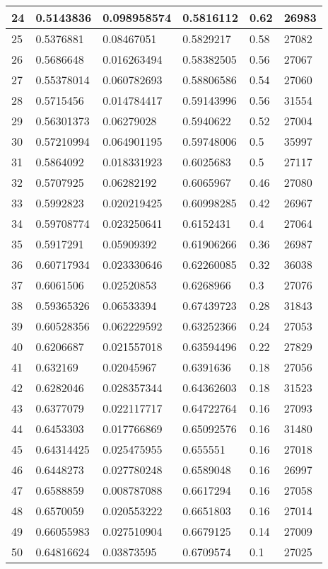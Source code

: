 \begin{longtable}{|l|l|l|l|l|l|}
24 & 0.5143836 & 0.098958574 & 0.5816112 & 0.62 & 26983 \\ \hline 
25 & 0.5376881 & 0.08467051 & 0.5829217 & 0.58 & 27082 \\ \hline 
26 & 0.5686648 & 0.016263494 & 0.58382505 & 0.56 & 27067 \\ \hline 
27 & 0.55378014 & 0.060782693 & 0.58806586 & 0.54 & 27060 \\ \hline 
28 & 0.5715456 & 0.014784417 & 0.59143996 & 0.56 & 31554 \\ \hline 
29 & 0.56301373 & 0.06279028 & 0.5940622 & 0.52 & 27004 \\ \hline 
30 & 0.57210994 & 0.064901195 & 0.59748006 & 0.5 & 35997 \\ \hline 
31 & 0.5864092 & 0.018331923 & 0.6025683 & 0.5 & 27117 \\ \hline 
32 & 0.5707925 & 0.06282192 & 0.6065967 & 0.46 & 27080 \\ \hline 
33 & 0.5992823 & 0.020219425 & 0.60998285 & 0.42 & 26967 \\ \hline 
34 & 0.59708774 & 0.023250641 & 0.6152431 & 0.4 & 27064 \\ \hline 
35 & 0.5917291 & 0.05909392 & 0.61906266 & 0.36 & 26987 \\ \hline 
36 & 0.60717934 & 0.023330646 & 0.62260085 & 0.32 & 36038 \\ \hline 
37 & 0.6061506 & 0.02520853 & 0.6268966 & 0.3 & 27076 \\ \hline 
38 & 0.59365326 & 0.06533394 & 0.67439723 & 0.28 & 31843 \\ \hline 
39 & 0.60528356 & 0.062229592 & 0.63252366 & 0.24 & 27053 \\ \hline 
40 & 0.6206687 & 0.021557018 & 0.63594496 & 0.22 & 27829 \\ \hline 
41 & 0.632169 & 0.02045967 & 0.6391636 & 0.18 & 27056 \\ \hline 
42 & 0.6282046 & 0.028357344 & 0.64362603 & 0.18 & 31523 \\ \hline 
43 & 0.6377079 & 0.022117717 & 0.64722764 & 0.16 & 27093 \\ \hline 
44 & 0.6453303 & 0.017766869 & 0.65092576 & 0.16 & 31480 \\ \hline 
45 & 0.64314425 & 0.025475955 & 0.655551 & 0.16 & 27018 \\ \hline 
46 & 0.6448273 & 0.027780248 & 0.6589048 & 0.16 & 26997 \\ \hline 
47 & 0.6588859 & 0.008787088 & 0.6617294 & 0.16 & 27058 \\ \hline 
48 & 0.6570059 & 0.020553222 & 0.6651803 & 0.16 & 27014 \\ \hline 
49 & 0.66055983 & 0.027510904 & 0.6679125 & 0.14 & 27009 \\ \hline 
50 & 0.64816624 & 0.03873595 & 0.6709574 & 0.1 & 27025 \\ \hline 
\end{longtable}